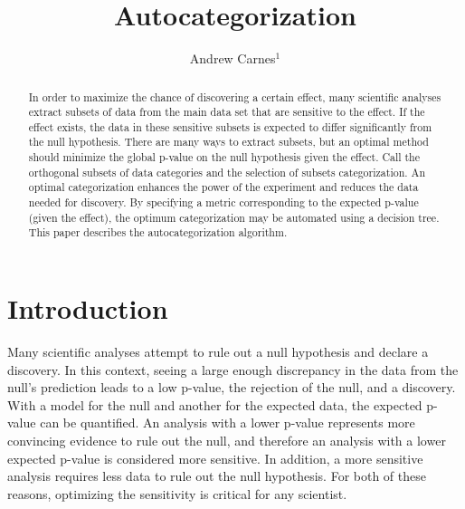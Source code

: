 \documentclass[review]{elsarticle}
\begin{document}
\begin{frontmatter}

\title{Autocategorization}

\author{Andrew Carnes$^{1}$}
\address{$^1$University of Florida}

\begin{abstract}
In order to maximize the chance of discovering a certain effect, many scientific analyses extract subsets of data from the main data set that are sensitive to the effect. If the effect exists, the data in these sensitive subsets is expected to differ significantly from the null hypothesis. There are many ways to extract subsets, but an optimal method should minimize the global p-value on the null hypothesis given the effect. Call the orthogonal subsets of data categories and the selection of subsets categorization. An optimal categorization enhances the power of the experiment and reduces the data needed for discovery. By specifying a metric corresponding to the expected p-value (given the effect), the optimum categorization may be automated using a decision tree. This paper describes the autocategorization algorithm. 
\end{abstract}


\end{frontmatter}

\linenumbers

\section{Introduction}

Many scientific analyses attempt to rule out a null hypothesis and declare a discovery. In this context, seeing a large enough discrepancy in the data from the null's prediction leads to a low p-value, the rejection of the null, and a discovery. With a model for the null and another for the expected data, the expected p-value can be quantified. An analysis with a lower p-value represents more convincing evidence to rule out the null, and therefore an analysis with a lower expected p-value is considered more sensitive. In addition, a more sensitive analysis requires less data to rule out the null hypothesis. For both of these reasons, optimizing the sensitivity is critical for any scientist.
\end{document}
